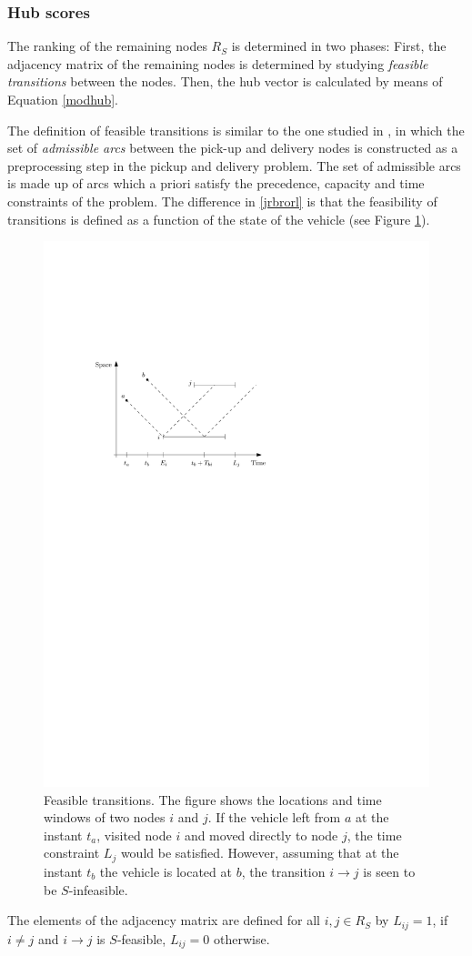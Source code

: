 \documentclass[dissertation,draft*]{aaltoseries}
\begin{document}
\subsubsection{Hub scores}
\label{feasibility}
The ranking of the remaining nodes $R_S$ is determined in two phases: 
First, the adjacency matrix of the remaining nodes is determined by studying 
\emph{feasible transitions} between the nodes.
Then, the hub vector is calculated by means of Equation \eqref{modhub}.

The definition of feasible transitions is similar to the one studied in \cite{dumas03}, 
in which the set of \emph{admissible arcs} between the pick-up and delivery nodes is constructed
as a preprocessing step in the pickup and delivery problem. The set of admissible arcs is 
made up of arcs which a priori satisfy the precedence, capacity and time constraints of the problem.
The difference in \ref{jrbrorl} is that the feasibility of 
transitions is defined as a function of the state of the vehicle (see Figure \ref{transitions01}).

\begin{figure}[ht]
\begin{center}
\includegraphics[width=0.7\columnwidth]{transitions01.pdf}
\caption{Feasible transitions. The figure shows the 
locations and time windows of two nodes $i$ and $j$.
If the vehicle left from $a$ at the instant $t_a$, visited node $i$
and moved directly to node $j$, the time constraint $L_j$ would be satisfied. 
However, assuming that at the instant $t_b$ the vehicle is located at $b$, the
transition $i \to j$ is seen to be $S$-infeasible.
}
\label{transitions01}
\end{center}
\end{figure}
The elements of the adjacency matrix are defined for all $i,j \in R_S$ by 
$L_{ij}= 1$, if $i \neq j$ and $i \to j$ is $S$-feasible, $L_{ij} = 0$ otherwise.
\end{document}
